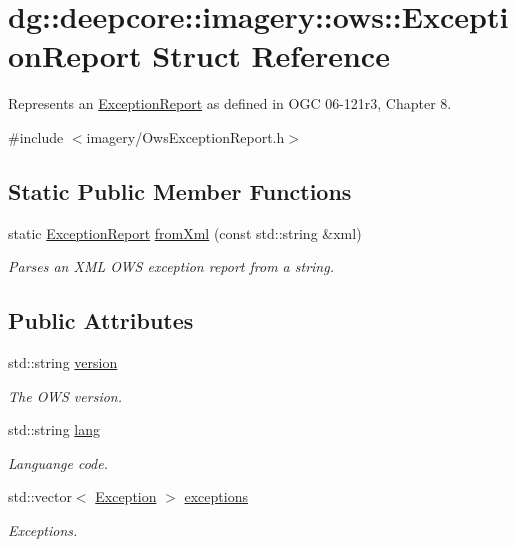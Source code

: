 \hypertarget{structdg_1_1deepcore_1_1imagery_1_1ows_1_1_exception_report}{}\section{dg\+:\+:deepcore\+:\+:imagery\+:\+:ows\+:\+:Exception\+Report Struct Reference}
\label{structdg_1_1deepcore_1_1imagery_1_1ows_1_1_exception_report}


Represents an \hyperlink{structdg_1_1deepcore_1_1imagery_1_1ows_1_1_exception_report}{Exception\+Report} as defined in O\+GC 06-\/121r3, Chapter 8.  




{\ttfamily \#include $<$imagery/\+Ows\+Exception\+Report.\+h$>$}

\subsection*{Static Public Member Functions}
\begin{DoxyCompactItemize}
\item 
static \hyperlink{structdg_1_1deepcore_1_1imagery_1_1ows_1_1_exception_report}{Exception\+Report} \hyperlink{group___imagery_module_ga7b82aed41808b9bebc202721d9a5adce}{from\+Xml} (const std\+::string \&xml)
\begin{DoxyCompactList}\small\item\em Parses an X\+ML O\+WS exception report from a string. \end{DoxyCompactList}\end{DoxyCompactItemize}
\subsection*{Public Attributes}
\begin{DoxyCompactItemize}
\item 
std\+::string \hyperlink{structdg_1_1deepcore_1_1imagery_1_1ows_1_1_exception_report_aee7406892476149864fb6a4d683b8dbc}{version}
\begin{DoxyCompactList}\small\item\em The O\+WS version. \end{DoxyCompactList}\item 
std\+::string \hyperlink{structdg_1_1deepcore_1_1imagery_1_1ows_1_1_exception_report_a3cc19f5f1be081777526f2f32872f787}{lang}
\begin{DoxyCompactList}\small\item\em Languange code. \end{DoxyCompactList}\item 
std\+::vector$<$ \hyperlink{structdg_1_1deepcore_1_1imagery_1_1ows_1_1_exception}{Exception} $>$ \hyperlink{structdg_1_1deepcore_1_1imagery_1_1ows_1_1_exception_report_ae1a4d944b177a13ddb4253ab8bbbc979}{exceptions}
\begin{DoxyCompactList}\small\item\em Exceptions. \end{DoxyCompactList}\end{DoxyCompactItemize}


